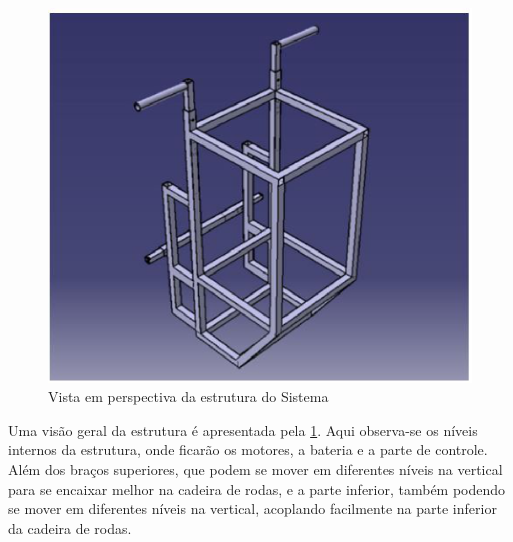 \begin{figure}[!htb]
\centering
\includegraphics[keepaspectratio=true,scale=0.7]{figuras/resultados/vista_perspectiva_estrutura}
\caption{Vista em perspectiva da estrutura do Sistema}
\label{fig:vista_perspectiva_estrutura}
\end{figure}

Uma visão geral da estrutura é apresentada pela \ref{fig:vista_perspectiva_estrutura}. Aqui observa-se os níveis internos da estrutura, onde ficarão os motores, a bateria e a parte de controle. Além dos braços superiores, que podem se mover em diferentes níveis na vertical para se encaixar melhor na cadeira de rodas, e a parte inferior, também podendo se mover em diferentes níveis na vertical, acoplando facilmente na parte inferior da cadeira de rodas.

